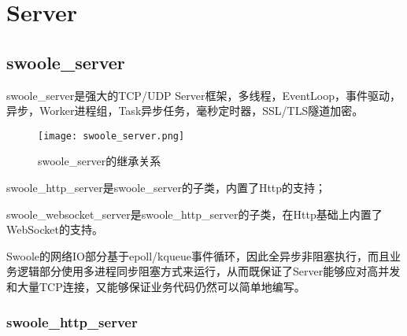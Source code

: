 \begin{lstlisting}[language=bash]

\end{lstlisting}

\chapter{Server}



\section{swoole\_server}

swoole\_server是强大的TCP/UDP Server框架，多线程，EventLoop，事件驱动，异步，Worker进程组，Task异步任务，毫秒定时器，SSL/TLS隧道加密。

\begin{figure}[htbp]
\centering
\texttt{[image: swoole\_server.png]}
\caption{swoole\_server的继承关系}
\end{figure}

\begin{compactitem}
\item swoole\_http\_server是swoole\_server的子类，内置了Http的支持；
\item swoole\_websocket\_server是swoole\_http\_server的子类，在Http基础上内置了WebSocket的支持。
\end{compactitem}

Swoole的网络IO部分基于epoll/kqueue事件循环，因此全异步非阻塞执行，而且业务逻辑部分使用多进程同步阻塞方式来运行，从而既保证了Server能够应对高并发和大量TCP连接，又能够保证业务代码仍然可以简单地编写。





\subsection{swoole\_http\_server}




\begin{lstlisting}[language=bash]

\end{lstlisting}


\begin{lstlisting}[language=bash]

\end{lstlisting}

\begin{lstlisting}[language=bash]

\end{lstlisting}

